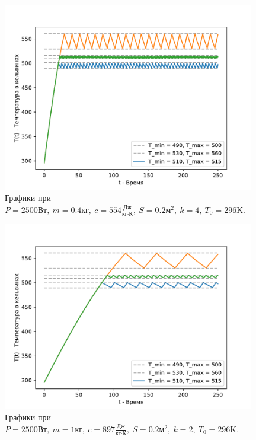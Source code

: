         \begin{figure}[H]
            \centering
            \includegraphics[width=11cm]{pictures/utug3.pdf}
            \caption{Графики при $P = 2500 \text{Вт}, ~ m = 0.4 \text{кг}, ~ c = 554 \frac{\text{Дж}}{\text{кг} \cdot \text{К}}, ~ S = 0.2 \text{м}^2, ~ k = 4, ~ T_0 = 296 \text{K}$.}
        \end{figure}


        \begin{figure}[H]
            \centering
            \includegraphics[width=11cm]{pictures/utug4.pdf}
            \caption{Графики при $P = 2500 \text{Вт}, ~ m = 1 \text{кг}, ~ c = 897 \frac{\text{Дж}}{\text{кг} \cdot \text{К}}, ~ S = 0.2 \text{м}^2, ~ k = 2, ~ T_0 = 296 \text{K}$.}
        \end{figure}


